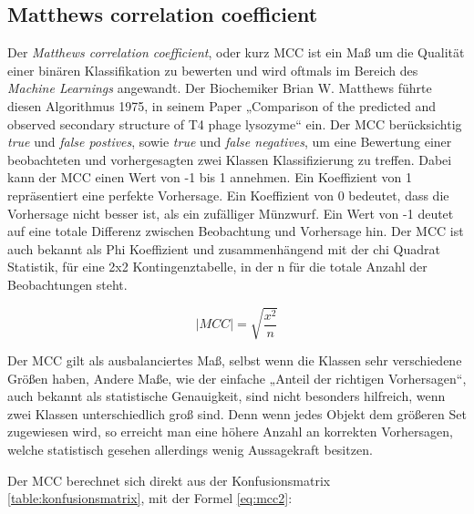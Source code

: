 \subsection{Matthews correlation coefficient}
Der \emph{Matthews correlation coefficient}, oder kurz MCC ist ein Maß um die Qualität einer binären Klassifikation zu bewerten und wird oftmals im Bereich des \emph{Machine Learnings} angewandt. Der Biochemiker Brian W. Matthews führte diesen Algorithmus 1975, in seinem Paper „Comparison of the predicted and observed secondary structure of T4 phage lysozyme“ \cite{Matthews.1975} ein. Der MCC berücksichtig \emph{true} und \emph{false postives}, sowie \emph{true} und \emph{false negatives}, um eine Bewertung einer beobachteten und vorhergesagten zwei Klassen Klassifizierung zu treffen. Dabei kann der MCC einen Wert von -1 bis 1 annehmen. Ein Koeffizient von 1 repräsentiert eine perfekte Vorhersage. Ein Koeffizient von 0 bedeutet, dass die Vorhersage nicht besser ist, als ein zufälliger Münzwurf. Ein Wert von -1 deutet auf eine totale Differenz zwischen Beobachtung und Vorhersage hin. Der MCC ist auch bekannt als Phi Koeffizient und zusammenhängend mit der chi Quadrat Statistik, für eine 2x2 Kontingenztabelle, in der n für die totale Anzahl der Beobachtungen steht.

\begin{equation}
    |MCC| = \sqrt{\frac{x^2}{n}}
    \label{eq:mcc}
\end{equation}

Der MCC gilt als ausbalanciertes Maß, selbst wenn die Klassen sehr verschiedene Größen haben, Andere Maße, wie der einfache „Anteil der richtigen Vorhersagen“, auch bekannt als statistische Genauigkeit, sind nicht besonders hilfreich, wenn zwei Klassen unterschiedlich groß sind. Denn wenn jedes Objekt dem größeren Set zugewiesen wird, so erreicht man eine höhere Anzahl an korrekten Vorhersagen, welche statistisch gesehen allerdings wenig Aussagekraft besitzen.

Der MCC berechnet sich direkt aus der Konfusionsmatrix \ref{table:konfusionsmatrix}, mit der Formel \ref{eq:mcc2}:

\begin{table}[H]
    \centering
        \caption{Dargestellt ist die Konfusionsmatrix. tp = \emph{true positives}, fp = \emph{false postives}, tn \emph{true negatives} und fn = \emph{false negatives}.}
    \label{table:konfusionsmatrix}
\end{table}

